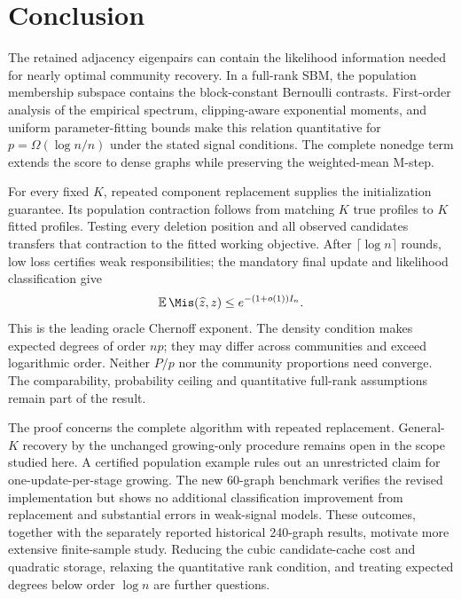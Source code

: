 \section{Conclusion}
\label{sec:conclusion}

The retained adjacency eigenpairs can contain the likelihood information needed for nearly optimal community recovery. In a full-rank SBM, the population membership subspace contains the block-constant Bernoulli contrasts. First-order analysis of the empirical spectrum, clipping-aware exponential moments, and uniform parameter-fitting bounds make this relation quantitative for $p=\Omega(\log n/n)$ under the stated signal conditions. The complete nonedge term extends the score to dense graphs while preserving the weighted-mean M-step.

For every fixed $K$, repeated component replacement supplies the initialization guarantee. Its population contraction follows from matching $K$ true profiles to $K$ fitted profiles. Testing every deletion position and all observed candidates transfers that contraction to the fitted working objective. After $\lceil\log n\rceil$ rounds, low loss certifies weak responsibilities; the mandatory final update and likelihood classification give
\[
 \mathbb E\,\Mis(\widehat z,z)\le e^{-(1+o(1))I_n}.
\]
This is the leading oracle Chernoff exponent. The density condition makes expected degrees of order $np$; they may differ across communities and exceed logarithmic order. Neither $P/p$ nor the community proportions need converge. The comparability, probability ceiling and quantitative full-rank assumptions remain part of the result.

The proof concerns the complete algorithm with repeated replacement. General-$K$ recovery by the unchanged growing-only procedure remains open in the scope studied here. A certified population example rules out an unrestricted claim for one-update-per-stage growing. The new 60-graph benchmark verifies the revised implementation but shows no additional classification improvement from replacement and substantial errors in weak-signal models. These outcomes, together with the separately reported historical 240-graph results, motivate more extensive finite-sample study. Reducing the cubic candidate-cache cost and quadratic storage, relaxing the quantitative rank condition, and treating expected degrees below order $\log n$ are further questions.
